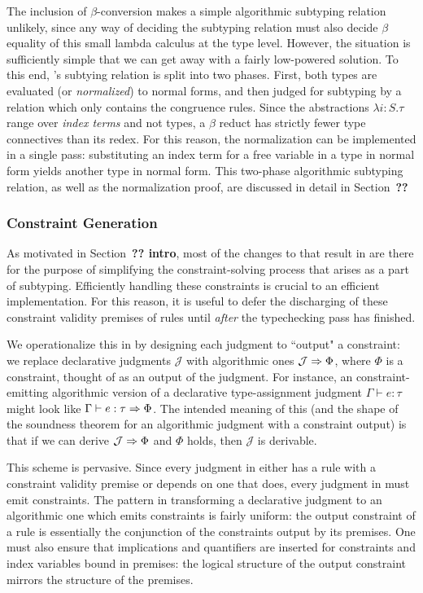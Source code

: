 The inclusion of $\beta$-conversion makes a simple algorithmic subtyping relation unlikely, since any way of deciding the subtyping relation must also decide $\beta$ equality of this small lambda calculus at the type level. However, the situation is sufficiently simple that we can get away with a fairly low-powered solution. To this end, \bilambdaamor's subtying relation is split into two phases. First, both types are evaluated (or \textit{normalized}) to normal forms, and then judged for subtyping by a relation which only contains the congruence rules. Since the abstractions $\lambda i : S.\tau$ range over \textit{index terms} and not types, a $\beta$ reduct has strictly fewer type connectives than its redex. For this reason, the normalization can be implemented in a single pass: substituting an index term for a free variable in a type in normal form yields another type in normal form. This two-phase algorithmic subtyping relation, as well as the normalization proof, are discussed in detail in Section~\textbf{??}

\subsubsection{Constraint Generation}
As motivated in Section~\textbf{?? intro}, most of the changes to \lambdaamor that result in \dlambdaamor are there for the purpose of simplifying the constraint-solving process that arises as a part of subtyping. Efficiently handling these constraints is crucial to an efficient implementation. For this reason, it is useful to defer the discharging of these constraint validity premises of rules until \textit{after} the typechecking pass has finished.

We operationalize this in \bilambdaamor by designing each judgment to ``output" a constraint: we replace declarative judgments $\mathcal{J}$ with algorithmic ones $\mathcal{J} \Rightarrow \Phi$, where $\Phi$ is a constraint, thought of as an output of the judgment. For instance, an constraint-emitting algorithmic version of a declarative type-assignment judgment $\Gamma \vdash e : \tau$ might look like $\Gamma \vdash e : \tau \Rightarrow \Phi$. The intended meaning of this (and the shape of the soundness theorem for an algorithmic judgment with a constraint output) is that if we can derive $\mathcal{J} \Rightarrow \Phi$ and $\Phi$ holds, then $\mathcal{J}$ is derivable.

This scheme is pervasive. Since every judgment in \dlambdaamor either has a rule with a constraint validity premise or depends on one that does, every judgment in \bilambdaamor must emit constraints. The pattern in transforming a declarative judgment to an algorithmic one which emits constraints is fairly uniform: the output constraint of a rule is essentially the conjunction of the constraints output by its premises. One must also ensure that implications and quantifiers are inserted for constraints and index variables bound in premises: the logical structure of the output constraint mirrors the structure of the premises.

